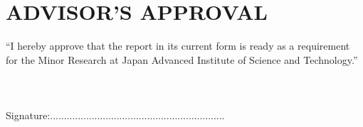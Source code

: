 \chapter*{\centering ADVISOR'S APPROVAL}
\noindent ``I hereby approve that the report in its current form is ready as a requirement for the Minor Research at Japan Advanced Institute of Science and Technology.''\\\\\\\\
Signature:...............................................................